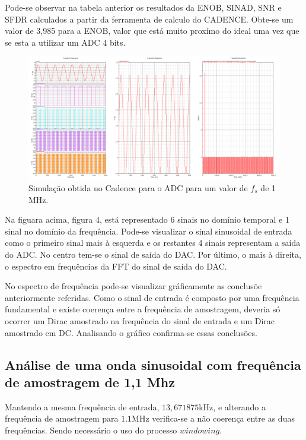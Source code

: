 \documentclass[11pt]{article}
\numberwithin{equation}{section}
\begin{document}
	Pode-se observar na tabela anterior os resultados da ENOB, SINAD, SNR e SFDR calculados a partir da ferramenta de calculo do CADENCE. Obte-se um valor de 3,985 para a ENOB, valor que está muito proxímo do ideal uma vez que se esta a utilizar um ADC 4 bits.
\begin{figure}[h]
	\centering
	\includegraphics[keepaspectratio=true, scale=0.32]{lab/f_fft_1M.png}
	\caption{Simulação obtida no Cadence para o ADC para um valor de $f_{s}$ de 1 MHz.}
	\vspace{-0.8em}
\end{figure}
	 
	 Na figuara acima, figura 4, está representado 6 sinais no domínio temporal e 1 sinal no domínio da frequência. Pode-se visualizar o sinal sinusoidal de entrada como o primeiro sinal mais à esquerda e os restantes 4 sinais representam a saída do ADC. No centro tem-se o sinal de saída do DAC. Por último, o mais à direita, o espectro em frequências da FFT do sinal de saída do DAC.
	 
	 No espectro de frequência pode-se visualizar gráficamente as conclusõe anteriormente referidas. Como o sinal de entrada é composto por uma frequência fundamental e existe coerença entre a frequência de amostragem, deveria só ocorrer um Dirac amostrado na frequência do sinal de entrada e um Dirac amostrado em DC. Analisando o gráfico confirma-se essas conclusões.
\subsection{Análise de uma onda sinusoidal com frequência de amostragem de 1,1 Mhz}

Mantendo a mesma frequência de entrada, $13,671875$kHz, e alterando a frequência de amostragem para $1.1$MHz verifica-se a não coerença entre as duas frequências.
Sendo necessário o uso do processo $windowing$.
\end{document}

